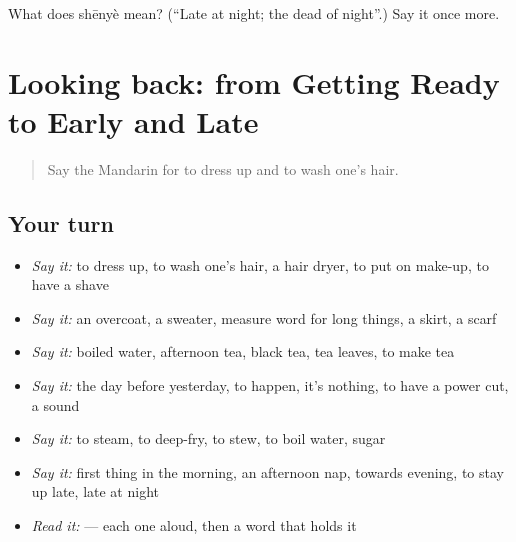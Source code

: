 \begin{tcolorbox}[breakable,colback=teal!4,colframe=teal!35!black,title={Before you move on}]
What does shēnyè mean? (\textquotedblleft{}Late at night; the dead of night\textquotedblright{}.) Say it once more.
\end{tcolorbox}
\section[(dialogue)]{Looking back: from Getting Ready to Early and Late}

\label{lesson:ZH-R169-review-164-169}



\begin{quote}
Say the Mandarin for to dress up and to wash one's hair.
\end{quote}

\subsection*{Your turn}
\begin{itemize}
\raggedright
  \item \emph{Say it:} to dress up, to wash one's hair, a hair dryer, to put on make-up, to have a shave
  \item \emph{Say it:} an overcoat, a sweater, measure word for long things, a skirt, a scarf
  \item \emph{Say it:} boiled water, afternoon tea, black tea, tea leaves, to make tea
  \item \emph{Say it:} the day before yesterday, to happen, it's nothing, to have a power cut, a sound
  \item \emph{Say it:} to steam, to deep-fry, to stew, to boil water, sugar
  \item \emph{Say it:} first thing in the morning, an afternoon nap, towards evening, to stay up late, late at night
  \item \emph{Read it:}     — each one aloud, then a word that holds it
\end{itemize}

